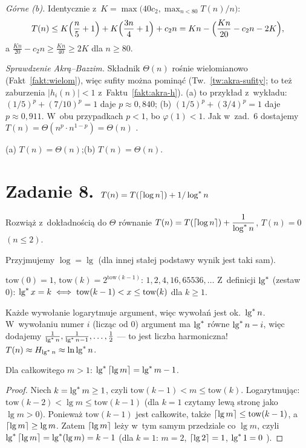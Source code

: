 \documentclass[11pt]{article}
\begin{document}
\emph{Górne (b).} Identycznie z~$K=\max\bigl(40c_2,\max_{n<80}T(n)/n\bigr)$:
\[
T(n)\le K\Bigl(\frac n5+1\Bigr)+K\Bigl(\frac{3n}4+1\Bigr)+c_2n=Kn-\Bigl(\frac{Kn}{20}-c_2n-2K\Bigr),
\]
a $\frac{Kn}{20}-c_2n\ge\frac{Kn}{40}\ge2K$ dla $n\ge80$.

\emph{Sprawdzenie Akrą--Bazzim.} Składnik $\Theta(n)$ rośnie wielomianowo
(Fakt~\ref{fakt:wielom}), więc sufity można pominąć
(Tw.~\ref{tw:akra-sufity}; to też zaburzenia $|h_i(n)|<1$ z~Faktu~\ref{fakt:akra-h}).
(a) to przykład z~wykładu: $(1/5)^p+(7/10)^p=1$ daje $p\approx0{,}840$; (b)
$(1/5)^p+(3/4)^p=1$ daje $p\approx0{,}911$. W~obu przypadkach $p<1$, bo
$\varphi(1)<1$. Jak w~zad.~6 dostajemy $T(n)=\Theta(n^p\cdot n^{1-p})=\Theta(n)$ \checkmark.
\begin{odpowiedz}(a) $T(n)=\Theta(n)$;\quad (b) $T(n)=\Theta(n)$.\end{odpowiedz}

\section{Zadanie 8. \texorpdfstring{$T(n)=T(\left\lceil \log n \right\rceil)+1/\log^*n$}{T(n) = T(ceil(log n)) + 1/log* n}}
\begin{tresc}
Rozwiąż z~dokładnością do $\Theta$ równanie
$T(n)=T(\left\lceil \log n \right\rceil)+\dfrac{1}{\log^*n}$, $T(n)=0$ $(n\le2)$.
\end{tresc}
Przyjmujemy $\log=\lg$ (dla innej stałej podstawy wynik jest taki sam).

\begin{teoria}
$\mathrm{tow}(0)=1$, $\mathrm{tow}(k)=2^{\mathrm{tow}(k-1)}$: $1,2,4,16,65536,\dots$
Z~definicji $\operatorname{lg}^{*}$ (zestaw 0): $\operatorname{lg}^{*} x=k\iff \mathrm{tow}(k-1)<x\le\mathrm{tow}(k)$ dla $k\ge1$.
\end{teoria}

\begin{intuicja}
Każde wywołanie logarytmuje argument, więc wywołań jest ok.\ $\operatorname{lg}^{*} n$.
W~wywołaniu numer $i$ (licząc od $0$) argument ma $\operatorname{lg}^{*}$ równe $\operatorname{lg}^{*} n-i$,
więc dodajemy $\frac{1}{\operatorname{lg}^{*} n},\frac1{\operatorname{lg}^{*} n-1},\dots,\frac12$ --- to jest
liczba harmoniczna! $T(n)\approx H_{\operatorname{lg}^{*} n}\approx\ln\operatorname{lg}^{*} n$.
\end{intuicja}

\begin{lemat}
Dla całkowitego $m>1$: $\operatorname{lg}^{*}\left\lceil \operatorname{lg} m \right\rceil=\operatorname{lg}^{*} m-1$.
\end{lemat}
\begin{proof}
Niech $k=\operatorname{lg}^{*} m\ge1$, czyli $\mathrm{tow}(k-1)<m\le\mathrm{tow}(k)$. Logarytmując:
$\mathrm{tow}(k-2)<\lg m\le\mathrm{tow}(k-1)$ (dla $k=1$ czytamy lewą stronę jako
$\lg m>0$). Ponieważ $\mathrm{tow}(k-1)$ jest całkowite, także
$\left\lceil \operatorname{lg} m \right\rceil\le\mathrm{tow}(k-1)$, a $\left\lceil \operatorname{lg} m \right\rceil\ge\operatorname{lg} m$. Zatem $\left\lceil \operatorname{lg} m \right\rceil$
leży w~tym samym przedziale co $\lg m$, czyli $\operatorname{lg}^{*}\left\lceil \operatorname{lg} m \right\rceil=\operatorname{lg}^{*}(\operatorname{lg} m)=k-1$
(dla $k=1$: $m=2$, $\left\lceil \operatorname{lg}2 \right\rceil=1$, $\operatorname{lg}^{*}1=0$ \checkmark).
\end{proof}
\end{document}
